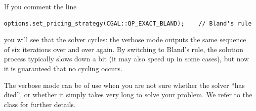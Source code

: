
If you comment the line 
\begin{verbatim}
options.set_pricing_strategy(CGAL::QP_EXACT_BLAND);    // Bland's rule
\end{verbatim}
you will see that the solver cycles: the verbose mode outputs the same
sequence of six iterations over and over again. By switching to 
Bland's rule, the solution process typically slows down a bit 
(it may also speed up in some cases), but now it is guaranteed that
no cycling occurs.

The verbose mode can be of use when you are not sure whether the
solver ``has died'', or whether it simply takes very long to solve
your problem.  We refer to the class 
for further details.

